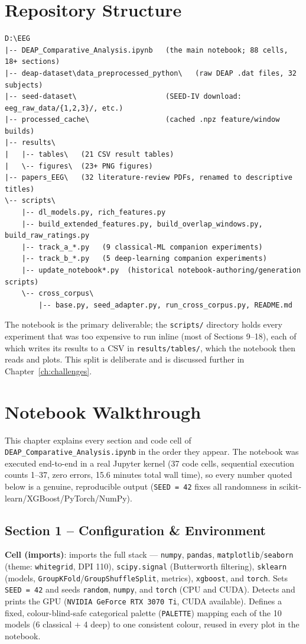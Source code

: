 \documentclass[11pt]{report}
\begin{document}
\chapter{Repository Structure}
\label{ch:repo}

\begin{verbatim}
D:\EEG
|-- DEAP_Comparative_Analysis.ipynb   (the main notebook; 88 cells, 18+ sections)
|-- deap-dataset\data_preprocessed_python\   (raw DEAP .dat files, 32 subjects)
|-- seed-dataset\                     (SEED-IV download: eeg_raw_data/{1,2,3}/, etc.)
|-- processed_cache\                  (cached .npz feature/window builds)
|-- results\
|   |-- tables\   (21 CSV result tables)
|   \-- figures\  (23+ PNG figures)
|-- papers_EEG\   (32 literature-review PDFs, renamed to descriptive titles)
\-- scripts\
    |-- dl_models.py, rich_features.py
    |-- build_extended_features.py, build_overlap_windows.py, build_raw_ratings.py
    |-- track_a_*.py   (9 classical-ML companion experiments)
    |-- track_b_*.py   (5 deep-learning companion experiments)
    |-- update_notebook*.py  (historical notebook-authoring/generation scripts)
    \-- cross_corpus\
        |-- base.py, seed_adapter.py, run_cross_corpus.py, README.md
\end{verbatim}

The notebook is the primary deliverable; the \texttt{scripts/} directory holds
every experiment that was too expensive to run inline (most of Sections
9--18), each of which writes its results to a CSV in
\texttt{results/tables/}, which the notebook then reads and plots. This
split is deliberate and is discussed further in Chapter~\ref{ch:challenges}.

\chapter{Notebook Walkthrough}
\label{ch:notebook}

This chapter explains every section and code cell of
\texttt{DEAP\_Comparative\_Analysis.ipynb} in the order they appear. The
notebook was executed end-to-end in a real Jupyter kernel (37 code cells,
sequential execution counts 1--37, zero errors, 15.6 minutes total wall
time), so every number quoted below is a genuine, reproducible output
(\texttt{SEED = 42} fixes all randomness in scikit-learn/XGBoost/PyTorch/NumPy).

\section{Section 1 -- Configuration \& Environment}
\textbf{Cell (imports)}: imports the full stack --- \texttt{numpy},
\texttt{pandas}, \texttt{matplotlib}/\texttt{seaborn} (theme:
\texttt{whitegrid}, DPI 110), \texttt{scipy.signal} (Butterworth filtering),
\texttt{sklearn} (models, \texttt{GroupKFold}/\texttt{GroupShuffleSplit},
metrics), \texttt{xgboost}, and \texttt{torch}. Sets \texttt{SEED = 42} and
seeds \texttt{random}, \texttt{numpy}, and \texttt{torch} (CPU and CUDA).
Detects and prints the GPU (\texttt{NVIDIA GeForce RTX 3070 Ti}, CUDA
available). Defines a fixed, colour-blind-safe categorical palette
(\texttt{PALETTE}) mapping each of the 10 models (6 classical + 4 deep) to
one consistent colour, reused in every plot in the notebook.
\end{document}
